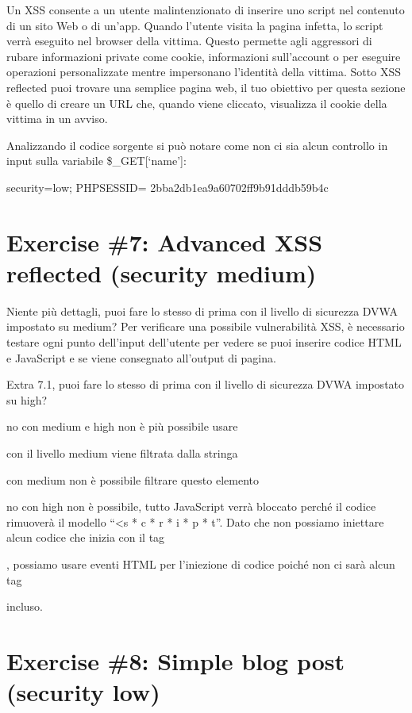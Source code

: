 \documentclass[11pt]{article}
\begin{document}
    Un XSS consente a un utente malintenzionato di inserire uno script nel
contenuto di un sito Web o di un'app. Quando l'utente visita la pagina
infetta, lo script verrà eseguito nel browser della vittima. Questo
permette agli aggressori di rubare informazioni private come cookie,
informazioni sull'account o per eseguire operazioni personalizzate
mentre impersonano l'identità della vittima. Sotto XSS reflected puoi
trovare una semplice pagina web, il tuo obiettivo per questa sezione è
quello di creare un URL che, quando viene cliccato, visualizza il cookie
della vittima in un avviso.

    Analizzando il codice sorgente si può notare come non ci sia alcun
controllo in input sulla variabile \$\_GET{[}`name'{]}:

security=low; PHPSESSID= 2bba2db1ea9a60702ff9b91dddb59b4c

    \hypertarget{exercise-7-advanced-xss-reflected-security-medium}{%
\section{Exercise \#7: Advanced XSS reflected (security
medium)}\label{exercise-7-advanced-xss-reflected-security-medium}}

    Niente più dettagli, puoi fare lo stesso di prima con il livello di
sicurezza DVWA impostato su medium? Per verificare una possibile
vulnerabilità XSS, è necessario testare ogni punto dell'input
dell'utente per vedere se puoi inserire codice HTML e JavaScript e se
viene consegnato all'output di pagina.

Extra 7.1, puoi fare lo stesso di prima con il livello di sicurezza DVWA
impostato su high?

    no con medium e high non è più possibile usare

con il livello medium viene filtrata dalla stringa

con medium non è possibile filtrare questo elemento

no con high non è possibile, tutto JavaScript verrà bloccato perché il
codice rimuoverà il modello ``\textless{}s * c * r * i * p * t''. Dato
che non possiamo iniettare alcun codice che inizia con il tag

, possiamo usare eventi HTML per l'iniezione di codice poiché non ci
sarà alcun tag

incluso.

    \hypertarget{exercise-8-simple-blog-post-security-low}{%
\section{Exercise \#8: Simple blog post (security
low)}\label{exercise-8-simple-blog-post-security-low}}
\end{document}
